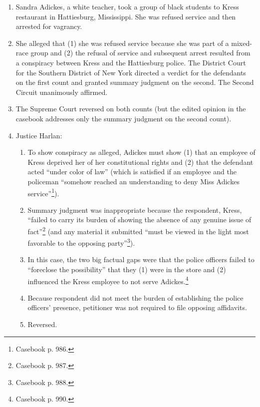 \begin{enumerate}
    \item Sandra Adickes, a white teacher, took a group of black students to 
    Kress restaurant in Hattiesburg, Mississippi. She was refused service and 
    then arrested for vagrancy.
    \item She alleged that (1) she was refused service because she was part of 
    a mixed-race group and (2) the refusal of service and subsequent arrest 
    resulted from a conspiracy between Kress and the Hattiesburg police. The 
    District Court for the Southern District of New York directed a verdict 
    for the defendants on the first count and granted summary judgment on the 
    second. The Second Circuit unanimously affirmed.
    \item The Supreme Court reversed on both counts (but the edited opinion in 
    the casebook addresses only the summary judgment on the second count).
    \item Justice Harlan:
    \begin{enumerate}
        \item To show conspiracy as alleged, Adickes must show (1) that an 
        employee of Kress deprived her of her constitutional rights and (2) 
        that the defendant acted ``under color of law'' (which is satisfied if 
        an employee and the policeman ``somehow reached an understanding to 
        deny Miss Adickes service''\footnote{Casebook p. 986.}).
        \item Summary judgment was inappropriate because the respondent, 
        Kress, ``failed to carry its burden of showing the absence of any 
        genuine issue of fact''\footnote{Casebook p. 987.} (and any material 
        it submitted ``must be viewed in the light most favorable to the 
        opposing party''\footnote{Casebook p. 988.}).
        \item In this case, the two big factual gaps were that the police 
        officers failed to ``foreclose the possibility'' that they (1) were in 
        the store and (2) influenced the Kress employee to not serve 
        Adickes.\footnote{Casebook p. 990.}
        \item Because respondent did not meet the burden of establishing the 
        police officers' presence, petitioner was not required to file 
        opposing affidavits.
        \item Reversed.
    \end{enumerate}
\end{enumerate}

